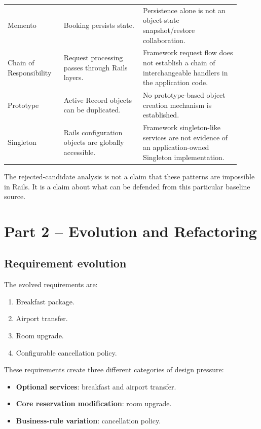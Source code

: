 \documentclass[10pt,a4paper]{article}
\begin{document}
\begin{longtable}{p{0.22\linewidth}p{0.31\linewidth}p{0.38\linewidth}}
Memento & Booking persists state. & Persistence alone is not an object-state snapshot/restore collaboration.\\
Chain of Responsibility & Request processing passes through Rails layers. & Framework request flow does not establish a chain of interchangeable handlers in the application code.\\
Prototype & Active Record objects can be duplicated. & No prototype-based object creation mechanism is established.\\
Singleton & Rails configuration objects are globally accessible. & Framework singleton-like services are not evidence of an application-owned Singleton implementation.\\
\bottomrule
\end{longtable}

The rejected-candidate analysis is not a claim that these patterns are impossible in Rails. It is a claim about what can be defended from this particular baseline source.

\section{Part 2 -- Evolution and Refactoring}

\subsection{Requirement evolution}

The evolved requirements are:

\begin{enumerate}[leftmargin=*]
\item Breakfast package.
\item Airport transfer.
\item Room upgrade.
\item Configurable cancellation policy.
\end{enumerate}

These requirements create three different categories of design pressure:

\begin{itemize}[leftmargin=*]
\item \textbf{Optional services}: breakfast and airport transfer.
\item \textbf{Core reservation modification}: room upgrade.
\item \textbf{Business-rule variation}: cancellation policy.
\end{itemize}
\end{document}
